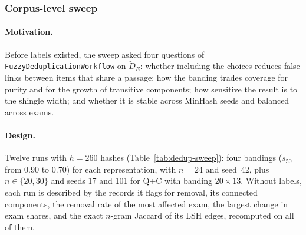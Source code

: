 \subsubsection{Corpus-level sweep}
\label{app:dedup-fuzzy-sweep}

\paragraph{Motivation.} Before labels existed, the sweep asked four
questions of \texttt{FuzzyDeduplicationWorkflow} on $\tilde D_E$: whether
including the choices reduces false links between items that share a
passage; how the banding trades coverage for purity and for the growth of
transitive components; how sensitive the result is to the shingle width; and
whether it is stable across MinHash seeds and balanced across exams.

\paragraph{Design.} Twelve runs with $h=260$ hashes
(Table~\ref{tab:dedup-sweep}): four bandings ($s_{50}$ from 0.90 to 0.70) for
each representation, with $n=24$ and seed~42, plus $n\in\{20,30\}$ and seeds
17 and 101 for Q+C with banding $20{\times}13$. Without labels, each run is
described by the records it flags for removal, its connected components, the
removal rate of the most affected exam, the largest change in exam shares,
and the exact $n$-gram Jaccard of its LSH edges, recomputed on all of them.

